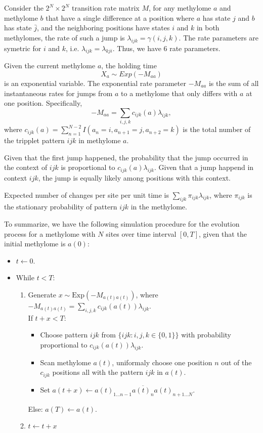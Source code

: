 \documentclass[11pt]{article}
\begin{document}
Consider the $2^N \times 2^N$ transition rate matrix $M$, for any
methylome $a$ and methylome $b$ that have a single difference at a
position where $a$ has state $j$ and $b$ has state $\bar{j}$, and the
neighboring positions have states $i$ and $k$ in both methylomes, the
rate of such a jump is $\lambda_{ijk} = \gamma(i, j, k)$.  The rate
parameters are symetric for $i$ and $k$,
i.e. $\lambda_{ijk}=\lambda_{kji}$. Thus, we have 6 rate parameters.

Given the current methylome $a$, the holding time
\[
  X_a\sim Exp(-M_{aa})
\]
is an exponential variable. The exponential rate
parameter $-M_{aa}$ is the sum of all instantaneous rates for jumps
from $a$ to a methylome that only differs with $a$ at one
position. Specifically,
\[
  -M_{aa} =  \sum\limits_{i,j,k}c_{ijk}(a)\lambda_{ijk},
\]
where $c_{ijk}(a) = \sum_{n=1}^{N-2}I(a_{n}=i, a_{n+1}=j, a_{n+2}=k)$ is the total number
of the tripplet pattern $ijk$ in methylome $a$.

Given that the first jump happened, the probability that the jump
occurred in the context of $ijk$ is proportional to
$c_{ijk}(a)\lambda_{ijk}$. Given that a jump happend in context $ijk$,
the jump is equally likely among positions with this context.

Expected number of changes per site per unit time is $\sum\limits_{ijk}\pi_{ijk}\lambda_{ijk}$,
where $\pi_{ijk}$ is the stationary probability of pattern $ijk$ in the methylome.

To summarize, we have the following simulation procedure for the evolution
process for a methylome with $N$ sites over time interval $[0, T]$, given
that the initial methylome is $a(0)$:
\begin{itemize}
\item $t \leftarrow 0$.
\item While $t < T$:
  \begin{enumerate}
  \item Generate $x\sim \text{Exp}(-M_{a(t)a(t)})$, where
    $-M_{a(t)a(t)} = \sum\limits_{i,j,k}c_{ijk}(a(t))\lambda_{ijk}$. \\
    If $t+x < T$:
    \begin{itemize}
    \item Choose pattern $ijk$ from $\{ijk: i,j,k\in\{0,1\}\}$ with
      probability proportional to $c_{ijk}(a(t))\lambda_{ijk}$.
    \item Scan methylome $a(t)$, uniformaly choose one position $n$
      out of the $c_{ijk}$ positions all with the pattern $ijk$ in $a(t)$.
    \item Set $a(t+x) \leftarrow a(t)_{1\ldots n-1} \overline{a(t)_n}
      a(t)_{n+1 \ldots N}$.
    \end{itemize}
    Else: $a(T) \leftarrow a(t)$.
  \item $t \leftarrow t+x$
  \end{enumerate}
\end{itemize}



\end{document}
